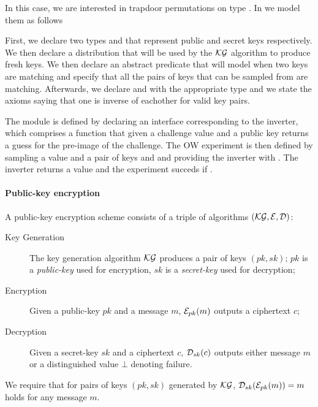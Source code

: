 In this case, we are interested in trapdoor permutations on type
. In \EasyCrypt we model them as follows


First, we declare two types  and  that represent
public and secret keys respectively. We then declare a distribution
 that will be used by the $\mathcal{KG}$ algorithm to produce fresh
keys. We then declare an abstract predicate that will model when two
keys are matching and specify that all the pairs of keys that can be
sampled from  are matching. Afterwards, we declare 
and  with the appropriate type and we state the axioms saying
that one is inverse of eachother for valid key pairs.
 
The module  is defined by declaring an interface corresponding
to the inverter, which comprises a function that given a challenge
value and a public key returns a guess for the pre-image of the
challenge. The OW experiment is then defined by sampling a value
 and a pair of keys  and  and providing the
inverter with . The inverter returns a value  and
the experiment succeds if .

\paragraph{Public-key encryption}
A public-key encryption scheme consists of a triple of algorithms
$(\mathcal{KG},\mathcal{E},\mathcal{D})$:

\begin{description}
\item[Key Generation] 
  The key generation algorithm $\mathcal{KG}$ produces a pair of keys $(pk,sk)$;
  $pk$ is a \emph{public-key} used for encryption, $sk$ is
  a \emph{secret-key} used for decryption;

\item[Encryption] 
  Given a public-key $pk$ and a message $m$, $\mathcal{E}_{pk}(m)$ outputs a
  ciphertext $c$;

\item[Decryption] 
  Given a secret-key $sk$ and a ciphertext $c$, $\mathcal{D}_{sk}(c)$ outputs
  either message $m$ or a distinguished value $\bot$ denoting failure.
\end{description}
%
We require that for pairs of keys $(pk,sk)$ generated by $\mathcal{KG}$,
$\mathcal{D}_{sk}(\mathcal{E}_{pk}(m))= m$ holds for any message $m$. 


